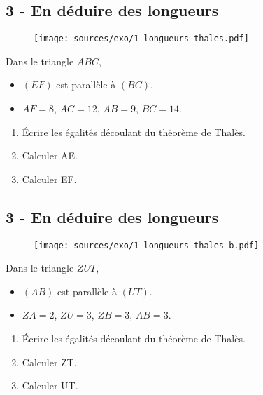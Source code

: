\documentclass[11pt]{article}
\begin{document}
\vspace{1cm}

\subsection*{3 - En déduire des longueurs}

\begin{multicols}{2}

\begin{figure}[H]
  \centering
  \texttt{[image: sources/exo/1\_longueurs-thales.pdf]}
\end{figure}

Dans le triangle $ABC$, 

\begin{itemize}
\item $(EF)$ est parallèle à $(BC)$.
\item $AF = 8$, $AC = 12$, $AB = 9$, $BC = 14$.
\end{itemize}

\begin{enumerate}
\item Écrire les égalités découlant du théorème de Thalès.
\item Calculer AE.
\item Calculer EF.
\end{enumerate}

\end{multicols}

\vspace{1cm}

\subsection*{3 - En déduire des longueurs}

\begin{multicols}{2}

\begin{figure}[H]
  \centering
  \texttt{[image: sources/exo/1\_longueurs-thales-b.pdf]}
\end{figure}

Dans le triangle $ZUT$, 

\begin{itemize}
\item $(AB)$ est parallèle à $(UT)$.
\item $ZA = 2$, $ZU = 3$, $ZB = 3$, $AB = 3$.
\end{itemize}

\begin{enumerate}
\item Écrire les égalités découlant du théorème de Thalès.
\item Calculer ZT.
\item Calculer UT.
\end{enumerate}

\end{multicols}
\end{document}
